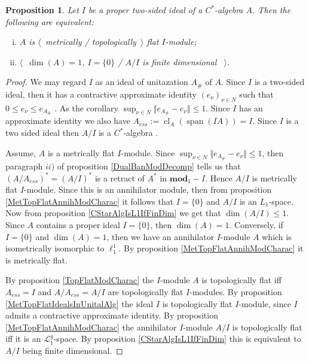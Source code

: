 \documentclass[12pt]{article}
\newtheorem{proposition}[theorem]{Proposition}
\begin{document}
\begin{proposition}\label{CStarAlgIsTopFlatOverItsIdeal} Let $I$ be a proper two-sided ideal of a  $C^*$-algebra $A$. Then the following are equivalent:
\begin{enumerate}[i)]
\item $A$ is $\langle$~metrically / topologically~$\rangle$ flat $I$-module;
\item $\langle$~$\operatorname{dim}(A)=1$, $I=\{0\}$ / $A/I$ is finite dimensional ~$\rangle$.
\end{enumerate}
\end{proposition}
\begin{proof} We may regard $I$ as an  ideal of unitazation $A_\#$ of $A$. Since $I$ is a two-sided ideal, then it has a contractive approximate identity $(e_\nu)_{\nu\in N}$ such that $0\leq e_\nu\leq e_{A_\#}$ \cite[proposition 4.7.79]{HelBanLocConvAlg}. As the corollary $\sup_{\nu\in N}\Vert e_{A_\#}-e_\nu\Vert\leq 1$. Since $I$ has an approximate identity we also have $A_{ess}:=\operatorname{cl}_A(\operatorname{span}(IA))=I$. Since $I$ is a two sided ideal then $A/I$ is a $C^*$-algebra \cite[theorem 4.7.81]{HelBanLocConvAlg}.

Assume, $A$ is a metrically flat $I$-module. Since $\sup_{\nu\in N}\Vert e_{A_\#}-e_\nu\Vert\leq 1$, then paragraph $ii)$ of proposition \ref{DualBanModDecomp} tells us that $(A/A_{ess})^*=(A/I)^*$ is a retract of $A^*$ in $\mathbf{mod}_1-I$. Hence $A/I$ is metrically flat $I$-module. Since this is an annihilator module, then from proposition \ref{MetTopFlatAnnihModCharac} it follows that $I=\{0\}$ and $A/I$ is an $L_1$-space. Now from proposition \ref{CStarAlgIsL1IfFinDim} we get that $\operatorname{dim}(A/I)\leq 1$. Since $A$ contains a proper ideal $I=\{0\}$, then $\operatorname{dim}(A)=1$. Conversely, if $I=\{0\}$ and $\operatorname{dim}(A)=1$, then we have an annihilator $I$-module $A$ which is isometrically isomorphic to $\ell_1^1$. By proposition \ref{MetTopFlatAnnihModCharac} it is metrically flat.

By proposition \ref{TopFlatModCharac} the $I$-module $A$ is topologically flat iff $A_{ess}=I$ and $A/A_{ess}=A/I$ are topologically flat $I$-modules. By proposition \ref{MetTopFlatIdealsInUnitalAlg} the ideal $I$ is topologically flat $I$-module, since $I$ admits a contractive approximate identity. By proposition \ref{MetTopFlatAnnihModCharac} the annihilator $I$-module $A/I$ is topologically flat iff it is an $\mathcal{L}_1^g$-space. By proposition \ref{CStarAlgIsL1IfFinDim} this is equivalent to $A/I$ being finite dimensional.
\end{proof}
\end{document}
